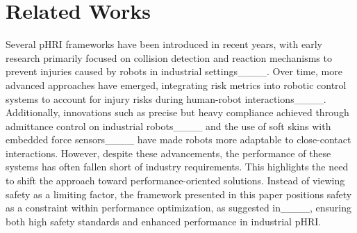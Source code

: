 \section{Related Works}
\label{sec:relatedworks}

Several pHRI frameworks have been introduced in recent years, with early research primarily focused on collision detection and reaction mechanisms to prevent injuries caused by robots in industrial settings____. Over time, more advanced approaches have emerged, integrating risk metrics into robotic control systems to account for injury risks during human-robot interactions____. Additionally, innovations such as precise but heavy compliance achieved through admittance control on industrial robots____ and the use of soft skins with embedded force sensors____ have made robots more adaptable to close-contact interactions. However, despite these advancements, the performance of these systems has often fallen short of industry requirements. This highlights the need to shift the approach toward performance-oriented solutions. Instead of viewing safety as a limiting factor, the framework presented in this paper positions safety as a constraint within performance optimization, as suggested in____, ensuring both high safety standards and enhanced performance in industrial pHRI.